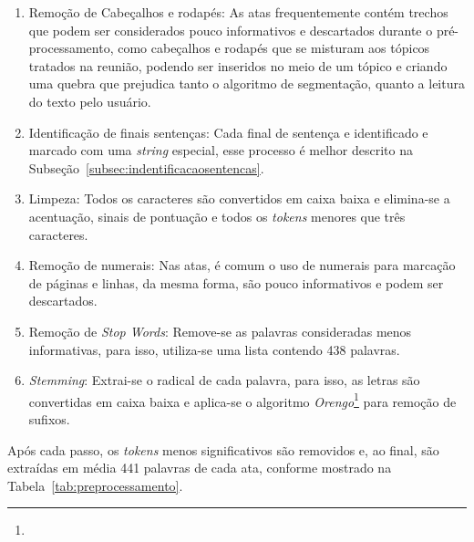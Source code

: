 \begin{enumerate}


\item Remoção de Cabeçalhos e rodapés: 
As atas frequentemente contém trechos que podem ser considerados pouco informativos e descartados durante o pré-processamento, como cabeçalhos e rodapés que se misturam aos tópicos tratados na reunião, podendo ser  inseridos no meio de um tópico e criando uma quebra que prejudica tanto o algoritmo de segmentação, quanto a leitura do texto pelo usuário.

\item Identificação de finais sentenças: 
Cada final de sentença e identificado e marcado com uma \textit{string} especial, esse processo é melhor descrito na Subseção~\ref{subsec:indentificacaosentencas}.

\item Limpeza: 
Todos os caracteres são convertidos em caixa baixa e elimina-se a acentuação, sinais de pontuação e todos os \textit{tokens} menores que três caracteres.

\item Remoção de numerais:
Nas atas, é comum o uso de numerais para marcação de páginas e linhas, da mesma forma, são pouco informativos e podem ser descartados.

\item Remoção de \textit{Stop Words}: 
Remove-se as palavras consideradas menos informativas, para isso, utiliza-se uma lista contendo 438 palavras. 

\item \textit{Stemming}:
Extrai-se o radical de cada palavra, para isso, as letras são convertidas em caixa baixa e aplica-se o algoritmo \textit{Orengo}\footnote{\urlorengo} para remoção de sufixos.

\end{enumerate}
	
	

Após cada passo, os \textit{tokens} menos significativos são removidos e, ao final, são extraídas em média 441 palavras de cada ata, conforme mostrado na Tabela~\ref{tab:preprocessamento}.

%
%
%
%
%
%


